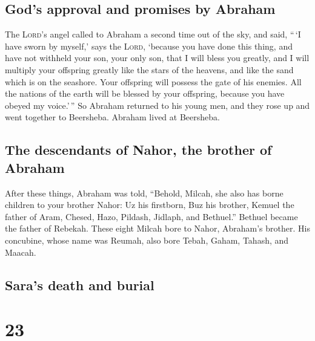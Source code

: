 \hypertarget{gods-approval-and-promises-by-abraham}{%
\subsection{God's approval and promises by
Abraham}\label{gods-approval-and-promises-by-abraham}}

 The \textsc{Lord}'s angel called to Abraham a second
time out of the sky,  and said, ``\,`I have sworn by
myself,' says the \textsc{Lord}, `because you have done this thing, and
have not withheld your son, your only son,  that I will
bless you greatly, and I will multiply your offspring greatly like the
stars of the heavens, and like the sand which is on the seashore. Your
offspring will possess the gate of his enemies.  All the
nations of the earth will be blessed by your offspring, because you have
obeyed my voice.'\,''  So Abraham returned to his young
men, and they rose up and went together to Beersheba. Abraham lived at
Beersheba.

\hypertarget{the-descendants-of-nahor-the-brother-of-abraham}{%
\subsection{The descendants of Nahor, the brother of
Abraham}\label{the-descendants-of-nahor-the-brother-of-abraham}}

 After these things, Abraham was told, ``Behold, Milcah,
she also has borne children to your brother Nahor:  Uz
his firstborn, Buz his brother, Kemuel the father of Aram,
 Chesed, Hazo, Pildash, Jidlaph, and Bethuel.''
 Bethuel became the father of Rebekah. These eight Milcah
bore to Nahor, Abraham's brother.  His concubine, whose
name was Reumah, also bore Tebah, Gaham, Tahash, and Maacah.

\hypertarget{saras-death-and-burial}{%
\subsection{Sara's death and burial}\label{saras-death-and-burial}}

\hypertarget{section-22}{%
\section{23}\label{section-22}}

